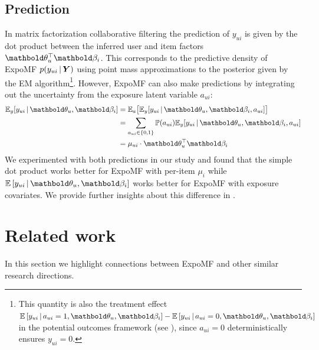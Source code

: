 \subsection{Prediction} \label{chpt:expomf:sec:pred}
In matrix factorization collaborative filtering the prediction of $y_{ui}$ is given by the dot product between the inferred user and item factors $\mb\theta_u^\top\mb\beta_i$. This corresponds to the predictive density of ExpoMF $p(y_{ui} \,\vert\, \boldsymbol{Y})$ using point mass approximations to the posterior given by the \gls{EM} algorithm\footnote{This quantity is also the treatment effect $\E{y_{ui} \g a_{ui}=1, \mb\theta_u, \mb\beta_i} - \E{y_{ui} \g a_{ui}=0, \mb\theta_u, \mb\beta_i}$ in the potential outcomes framework (see ), since $a_{ui}=0$ deterministically ensures $y_{ui}=0$.}. 
However, ExpoMF can also make predictions by integrating out the uncertainty from the exposure latent variable $a_{ui}$:
\begin{equation*}
\begin{split}
\mathbb{E}_y[y_{ui} \g \mb\theta_u, \mb\beta_i] &= \mathbb{E}_a\big[\mathbb{E}_y [y_{ui} \g \mb\theta_u, \mb\beta_i, a_{ui}]\big]\\
&= \sum_{a_{ui}\in \{0, 1\}} \mathbb{P}(a_{ui}) \mathbb{E}_y [y_{ui} \g \mb\theta_u, \mb\beta_i, a_{ui}] \\
&= \mu_{ui} \cdot \mb\theta_u^\top\mb\beta_i
\end{split}
\end{equation*}
We experimented with both predictions in our study and found that the
simple dot product works better for ExpoMF with per-item $\mu_i$ while
$\E{y_{ui} \g \mb\theta_u, \mb\beta_i}$ works better for ExpoMF with exposure covariates. We provide further insights about this difference in .


\section{Related work}
\label{chpt:expomf:sec:related}

In this section we highlight connections between ExpoMF and other
similar research directions. 



